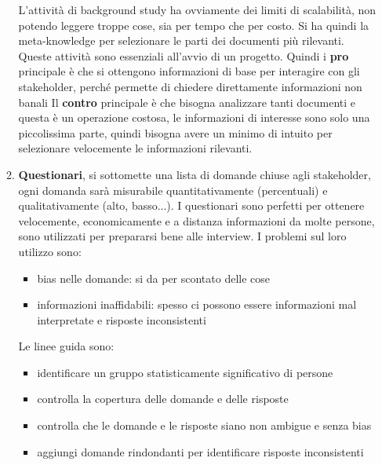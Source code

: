 \begin{itemize}
\begin{enumerate}
                        L'attività di background study ha ovviamente dei limiti di scalabilità,
                        non potendo leggere troppe cose, sia per tempo che per costo. Si ha quindi
                        la meta-knowledge per selezionare le parti dei documenti più rilevanti.
                        Queste attività sono essenziali all'avvio di un progetto.
                        Quindi i \textbf{pro} principale è che si ottengono informazioni
                        di base per interagire con gli stakeholder, perché permette di
                        chiedere direttamente informazioni non banali
                        Il \textbf{contro}  principale è che bisogna analizzare
                        tanti documenti e questa è un operazione costosa, le
                        informazioni di interesse sono solo una piccolissima parte,
                        quindi bisogna avere un minimo di intuito per selezionare
                        velocemente le informazioni rilevanti.
                  \item \textbf{Questionari}, si sottomette una lista di domande chiuse agli stakeholder,
                        ogni domanda sarà misurabile quantitativamente (percentuali)
                        e qualitativamente (alto, basso...). I questionari sono perfetti
                        per ottenere velocemente, economicamente e a distanza
                        informazioni da molte persone, sono utilizzati per prepararsi
                        bene alle interview. I problemi sul loro utilizzo sono:
                        \begin{itemize}
                              \item bias nelle domande: si da per scontato delle cose
                              \item informazioni inaffidabili: spesso ci possono essere informazioni mal interpretate e risposte inconsistenti
                        \end{itemize}
                        Le linee guida sono:
                        \begin{itemize}
                              \item identificare un gruppo statisticamente significativo di persone
                              \item controlla la copertura delle domande e delle risposte
                              \item controlla che le domande e le risposte siano non ambigue e senza bias
                              \item aggiungi domande rindondanti per identificare risposte inconsistenti

\end{itemize}
\end{enumerate}
\end{itemize}

